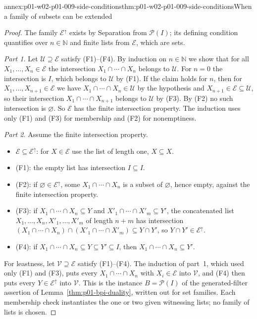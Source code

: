 \begin{annexitem}{annex:p01-w02-p01-009-side-conditions}{thm:p01-w02-p01-009-side-conditions}{When a family of subsets can be extended}
\begin{proof}
The family \(\mathcal E^{\uparrow}\) exists by Separation from
\(\mathcal P(I)\); its defining condition quantifies over \(n\in\mathbb N\)
and finite lists from \(\mathcal E\), which are sets.

\emph{Part 1.} Let \(\mathcal U\supseteq\mathcal E\) satisfy (F1)--(F4). By
induction on \(n\in\mathbb N\) we show that for all
\(X_1,\ldots,X_n\in\mathcal E\) the intersection
\(X_1\cap\cdots\cap X_n\) belongs to \(\mathcal U\). For \(n=0\) the
intersection is \(I\), which belongs to \(\mathcal U\) by (F1). If the claim
holds for \(n\), then for \(X_1,\ldots,X_{n+1}\in\mathcal E\) we have
\(X_1\cap\cdots\cap X_n\in\mathcal U\) by the hypothesis and
\(X_{n+1}\in\mathcal E\subseteq\mathcal U\), so their intersection
\(X_1\cap\cdots\cap X_{n+1}\) belongs to \(\mathcal U\) by (F3). By (F2) no
such intersection is \(\varnothing\). So \(\mathcal E\) has the finite
intersection property. The induction uses only (F1) and (F3) for membership
and (F2) for nonemptiness.

\emph{Part 2.} Assume the finite intersection property.
\begin{itemize}
  \item \(\mathcal E\subseteq\mathcal E^{\uparrow}\): for \(X\in\mathcal E\)
    use the list of length one, \(X\subseteq X\).
  \item (F1): the empty list has intersection \(I\subseteq I\).
  \item (F2): if \(\varnothing\in\mathcal E^{\uparrow}\), some
    \(X_1\cap\cdots\cap X_n\) is a subset of \(\varnothing\), hence empty,
    against the finite intersection property.
  \item (F3): if \(X_1\cap\cdots\cap X_n\subseteq Y\) and
    \(X'_1\cap\cdots\cap X'_m\subseteq Y'\), the concatenated list
    \(X_1,\ldots,X_n,X'_1,\ldots,X'_m\) of length \(n+m\) has intersection
    \((X_1\cap\cdots\cap X_n)\cap(X'_1\cap\cdots\cap X'_m)\subseteq Y\cap Y'\),
    so \(Y\cap Y'\in\mathcal E^{\uparrow}\).
  \item (F4): if \(X_1\cap\cdots\cap X_n\subseteq Y\subseteq Y'\subseteq I\),
    then \(X_1\cap\cdots\cap X_n\subseteq Y'\).
\end{itemize}
For leastness, let \(\mathcal V\supseteq\mathcal E\) satisfy (F1)--(F4). The
induction of part~1, which used only (F1) and (F3), puts every
\(X_1\cap\cdots\cap X_n\) with \(X_i\in\mathcal E\) into \(\mathcal V\), and
(F4) then puts every \(Y\in\mathcal E^{\uparrow}\) into \(\mathcal V\). This
is the instance \(B=\mathcal P(I)\) of the generated-filter assertion of
Lemma~\ref{thm:p01-bpi-duality}, written out for set families. Each
membership check instantiates the one or two given witnessing lists; no
family of lists is chosen.


\end{proof}
\end{annexitem}
